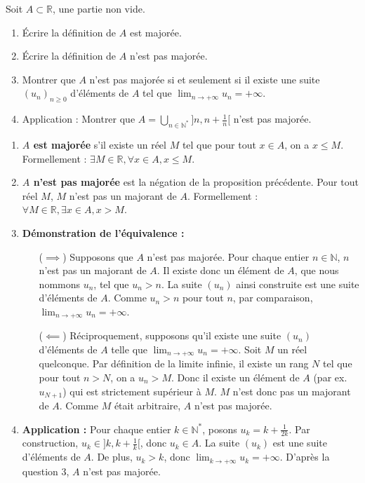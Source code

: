 \documentclass[solutions]{exercices}
\begin{document}
\begin{exercice}[\di]
Soit $A \subset \mathbb{R}$, une partie non vide.
\begin{enumerate}
	\item Écrire la définition de $A$ est majorée.
	\item Écrire la définition de $A$ n'est pas majorée.
	\item Montrer que $A$ n'est pas majorée si et seulement si il existe une suite $(u_n)_{n \ge 0}$ d'éléments de $A$ tel que $\lim_{n \to +\infty} u_n = +\infty$.
	\item Application : Montrer que $A = \bigcup_{n \in \mathbb{N}^*} ]n, n+\frac{1}{n}[$ n'est pas majorée.
\end{enumerate}
\end{exercice}

\begin{solution}
	\begin{enumerate}
		\item \textbf{$A$ est majorée} s'il existe un réel $M$ tel que pour tout $x \in A$, on a $x \le M$. Formellement : $\exists M \in \mathbb{R}, \forall x \in A, x \le M$.
		\item \textbf{$A$ n'est pas majorée} est la négation de la proposition précédente. Pour tout réel $M$, $M$ n'est pas un majorant de $A$. Formellement : $\forall M \in \mathbb{R}, \exists x \in A, x > M$.
		\item \textbf{Démonstration de l'équivalence :}
		      \begin{itemize}
			      \item[($\implies$)] Supposons que $A$ n'est pas majorée. Pour chaque entier $n \in \mathbb{N}$, $n$ n'est pas un majorant de $A$. Il existe donc un élément de $A$, que nous nommons $u_n$, tel que $u_n > n$. La suite $(u_n)$ ainsi construite est une suite d'éléments de $A$. Comme $u_n > n$ pour tout $n$, par comparaison, $\lim_{n \to +\infty} u_n = +\infty$.
			      \item[($\impliedby$)] Réciproquement, supposons qu'il existe une suite $(u_n)$ d'éléments de $A$ telle que $\lim_{n \to +\infty} u_n = +\infty$. Soit $M$ un réel quelconque. Par définition de la limite infinie, il existe un rang $N$ tel que pour tout $n > N$, on a $u_n > M$. Donc il existe un élément de $A$ (par ex. $u_{N+1}$) qui est strictement supérieur à $M$. $M$ n'est donc pas un majorant de $A$. Comme $M$ était arbitraire, $A$ n'est pas majorée.
		      \end{itemize}
		\item \textbf{Application :} Pour chaque entier $k \in \mathbb{N}^*$, posons $u_k = k + \frac{1}{2k}$. Par construction, $u_k \in ]k, k+\frac{1}{k}[$, donc $u_k \in A$. La suite $(u_k)$ est une suite d'éléments de $A$. De plus, $u_k > k$, donc $\lim_{k \to +\infty} u_k = +\infty$. D'après la question 3, $A$ n'est pas majorée.
	\end{enumerate}
\end{solution}
\end{document}
